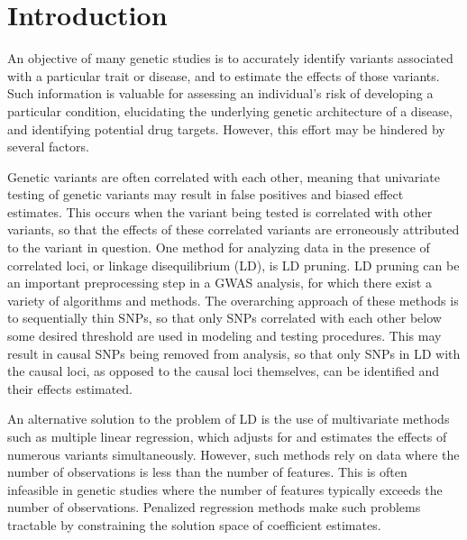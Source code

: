 
\section{Introduction}

An objective of many genetic studies is to accurately identify variants associated with a particular trait or disease, and to estimate the effects of those variants. Such information is valuable for assessing an individual's risk of developing a particular condition, elucidating the underlying genetic architecture of a disease, and identifying potential drug targets. However, this effort may be hindered by several factors. 

Genetic variants are often correlated with each other, meaning that univariate testing of genetic variants may result in false positives and biased effect estimates. This occurs when the variant being tested is correlated with other variants, so that the effects of these correlated variants are erroneously attributed to the variant in question. One method for analyzing data in the presence of correlated loci, or linkage disequilibrium (LD), is LD pruning. LD pruning can be an important preprocessing step in a GWAS analysis, for which there exist a variety of algorithms and methods. The overarching approach of these methods is to sequentially thin SNPs, so that only SNPs correlated with each other below some desired threshold are used in modeling and testing procedures. This may result in causal SNPs being removed from analysis, so that only SNPs in LD with the causal loci, as opposed to the causal loci themselves, can be identified and their effects estimated. 



An alternative solution to the problem of LD is the use of multivariate methods such as multiple linear regression, which adjusts for and estimates the effects of numerous variants simultaneously. However, such methods rely on data where the number of observations is less than the number of features. This is often infeasible in genetic studies where the number of features typically exceeds the number of observations. Penalized regression methods make such problems tractable by constraining the solution space of coefficient estimates.

